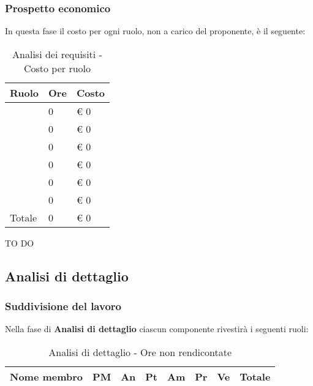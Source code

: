 		\subsubsection{Prospetto economico} %
		\label{ssub:prospetto_economico}
		In questa fase il costo per ogni ruolo, non a carico del proponente, è il seguente: \\
			\begin{table}[!h]
				\begin{center}
					\begin{tabularx}{0.6\textwidth}{|l|l|X|}
						\hline
						\textbf{Ruolo} & \textbf{Ore} & \textbf{Costo} \\
						\hline
						\roleProjectManager & 0 & \euro{} 0 \\
						\hline
						\roleAnalyst & 0 & \euro{} 0 \\
						\hline
						\roleDesigner & 0 & \euro{} 0 \\
						\hline
						\roleAdministrator & 0 & \euro{} 0 \\
						\hline
						\roleProgrammer & 0 & \euro{} 0 \\
						\hline
						\roleVerifier & 0 & \euro{} 0 \\
						\hline
						Totale & 0 & \euro{} 0 \\
						\hline
					\end{tabularx}
				\end{center}
			\caption{Analisi dei requisiti - Costo per ruolo}
			\end{table}
			
		\noindent
		TO DO
		
	
	\subsection{Analisi di dettaglio} %
	\label{sub:analisi_di_dettaglio}
		\subsubsection{Suddivisione del lavoro} %
		\label{ssub:suddivisione_del_lavoro}
		Nella fase di \textbf{Analisi di dettaglio} ciascun componente rivestirà i seguenti ruoli: \\
			\begin{table}[!h]
				\begin{center}
					\begin{tabularx}{0.9\textwidth}{|l|l|l|l|l|l|l|X|}
						\hline
						\textbf{Nome membro} & \textbf{PM} & \textbf{An} & \textbf{Pt} & \textbf{Am} & \textbf{Pr} & \textbf{Ve} & \textbf{Totale} \\
						\hline
						
						\hline		
					\end{tabularx}
				\end{center}
			\caption{Analisi di dettaglio - Ore non rendicontate}
			\end{table}
		

